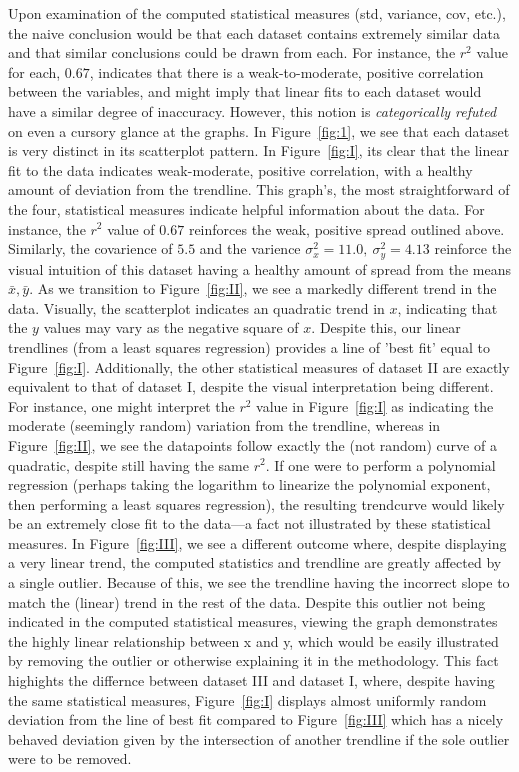 \documentclass[11pt,a4paper]{article}
\begin{document}
Upon examination of the computed statistical measures (std, variance, cov, etc.), the naive conclusion would be that each dataset contains extremely similar data and that similar conclusions could be drawn from each. For instance, the $r^2$ value for each, $0.67$, indicates that there is a weak-to-moderate, positive correlation between the variables, and might imply that linear fits to each dataset would have a similar degree of inaccuracy. However, this notion is \textit{categorically refuted} on even a cursory glance at the graphs. In Figure~\ref{fig:1}, we see that each dataset is very distinct in its scatterplot pattern. In Figure~\ref{fig:I}, its clear that the linear fit to the data indicates weak-moderate, positive correlation, with a healthy amount of deviation from the trendline. This graph's, the most straightforward of the four, statistical measures indicate helpful information about the data. For instance, the $r^2$ value of $0.67$ reinforces the weak, positive spread outlined above. Similarly, the covarience of $5.5$ and the varience $\sigma_x^2 = 11.0,\ \sigma_y^2 = 4.13$ reinforce the visual intuition of this dataset having a healthy amount of spread from the means $\bar{x}, \bar{y}$. 
As we transition to Figure~\ref{fig:II}, we see a markedly different trend in the data. Visually, the scatterplot indicates an quadratic trend in $x$, indicating that the $y$ values may vary as the negative square of $x$. Despite this, our linear trendlines (from a least squares regression) provides a line of 'best fit' equal to Figure~\ref{fig:I}. Additionally, the other statistical measures of dataset II are exactly equivalent to that of dataset I, despite the visual interpretation being different. For instance, one might interpret the $r^2$ value in Figure~\ref{fig:I} as indicating the moderate (seemingly random) variation from the trendline, whereas in Figure~\ref{fig:II}, we see the datapoints follow exactly the (not random) curve of a quadratic, despite still having the same $r^2$. If one were to perform a polynomial regression (perhaps taking the logarithm to linearize the polynomial exponent, then performing a least squares regression), the resulting trendcurve would likely be an extremely close fit to the data---a fact not illustrated by these statistical measures. 
In Figure~\ref{fig:III}, we see a different outcome where, despite displaying a very linear trend, the computed statistics and trendline are greatly affected by a single outlier. Because of this, we see the trendline having the incorrect slope to match the (linear) trend in the rest of the data. Despite this outlier not being indicated in the computed statistical measures, viewing the graph demonstrates the highly linear relationship between x and y, which would be easily illustrated by removing the outlier or otherwise explaining it in the methodology. This fact highights the differnce between dataset III and dataset I, where, despite having the same statistical measures, Figure~\ref{fig:I} displays almost uniformly random deviation from the line of best fit compared to Figure~\ref{fig:III} which has a nicely behaved deviation given by the intersection of another trendline if the sole outlier were to be removed.
\end{document}
